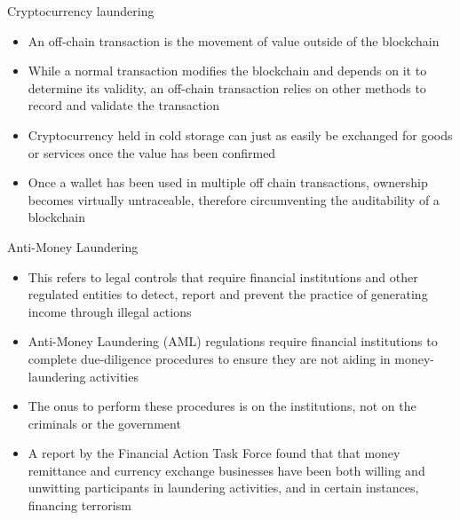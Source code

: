\documentclass[11pt]{beamer}
\begin{document}
\begin{frame}{Cryptocurrency laundering}
	\begin{itemize}
		\item An off-chain transaction is the movement of value outside of the blockchain
		\item While a normal transaction modifies the blockchain and depends on it to determine its validity, an off-chain transaction relies on other methods to record and validate the transaction
		\item Cryptocurrency held in cold storage can just as easily be exchanged for goods or services once the value has been confirmed
		\item Once a wallet has been used in multiple off chain transactions, ownership becomes virtually untraceable, therefore circumventing the auditability of a blockchain
	\end{itemize}
\end{frame}


\begin{frame}{Anti-Money Laundering}
	\begin{itemize}
		\item This refers to legal controls that require financial institutions and other regulated entities to detect, report and prevent the practice of generating income through illegal actions
		\item Anti-Money Laundering (AML) regulations require financial institutions to complete due-diligence procedures to ensure they are not aiding in money-laundering activities
		\item The onus to perform these procedures is on the institutions, not on the criminals or the government
		\item A report by the Financial Action Task Force found that that money remittance and currency exchange businesses have been both willing and unwitting participants in laundering activities, and in certain instances, financing terrorism
	\end{itemize}
\end{frame}


\end{document}
